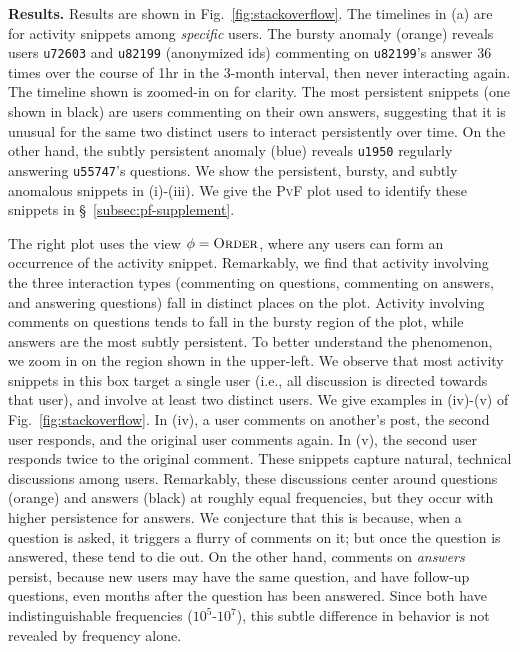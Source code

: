 \documentclass[sigconf]{acmart}
\newcommand{\pf}{\textsc{PvF}\xspace}
\newcommand{\view}{\phi}
\newcommand{\orderView}{\textsc{Order}\xspace}
\begin{document}
\vspace{0.1cm}
\noindent  \textbf{Results.} Results are shown in Fig.~\ref{fig:stackoverflow}. The timelines in (a) are for activity snippets among \emph{specific} users. The bursty anomaly (orange) reveals users \texttt{u72603} and \texttt{u82199} (anonymized ids) commenting on \texttt{u82199}'s answer 36 times over the course of 1hr in the 3-month interval, then never interacting again. The timeline shown is zoomed-in on for clarity. The most persistent snippets (one shown in black) are users commenting on their own answers, suggesting that it is unusual for the same two distinct users to interact persistently over time. On the other hand, the subtly persistent anomaly (blue) reveals \texttt{\small u1950} regularly answering \texttt{\small u55747}'s questions. We show the persistent, bursty, and subtly anomalous snippets in (i)-(iii). We give the \pf plot used to identify these snippets in \S~\ref{subsec:pf-supplement}.

The right plot uses the view $\view = \orderView$, where any users can form an occurrence of the activity snippet. Remarkably, we find that activity involving the three interaction types (commenting on questions, commenting on answers, and answering questions) fall in distinct places on the plot. Activity involving comments on questions tends to fall in the bursty region of the plot, while answers are the most subtly persistent. 
To better understand the phenomenon, we zoom in on the region shown in the upper-left.
We observe that most activity snippets in this box target a single user (i.e., all discussion is directed towards that user), and involve at least two distinct users. We give examples in (iv)-(v) of Fig.~\ref{fig:stackoverflow}. In (iv), a user comments on another's post, the second user responds, and the original user comments again. In (v), the second user responds twice to the original comment. These snippets capture natural, technical discussions among users. Remarkably, these discussions center around questions (orange) and answers (black) at roughly equal frequencies, but they occur with higher persistence for answers. We conjecture that this is because, when a question is asked, it triggers a flurry of comments on it; but once the question is answered, these tend to die out. On the other hand, comments on \emph{answers} persist, because new users may have the same question, and have follow-up questions, even months after the question has been answered. {Since both have indistinguishable frequencies ($10^5$-$10^7$), this subtle difference in behavior is not revealed by frequency alone.}
\end{document}

